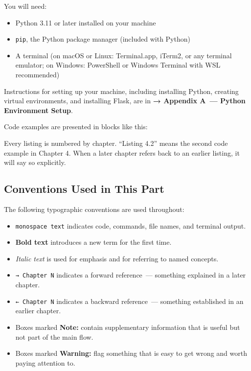You will need:

\begin{itemize}
\tightlist
\item
  Python 3.11 or later installed on your machine
\item
  \texttt{pip}, the Python package manager (included with Python)
\item
  A terminal (on macOS or Linux: Terminal.app, iTerm2, or any terminal emulator; on Windows: PowerShell or Windows Terminal with WSL recommended)
\end{itemize}

\noindent{}Instructions for setting up your machine, including installing Python, creating virtual environments, and installing Flask, are in \textbf{→ Appendix A~--- Python Environment Setup}.

Code examples are presented in blocks like this:

\begin{codebox}[short]

\begin{Shaded}
\begin{Highlighting}[]
\NormalTok{(}\NormalTok{)}
\end{Highlighting}
\end{Shaded}

\end{codebox}

\noindent{}Every listing is numbered by chapter. ``Listing 4.2'' means the second code example in Chapter 4. When a later chapter refers back to an earlier listing, it will say so explicitly.

\subsection*{Conventions Used in This Part}\label{part4-introduction:conventions-used-in-this-part}

The following typographic conventions are used throughout:

\begin{itemize}
\tightlist
\item
  \texttt{monospace\ text} indicates code, commands, file names, and terminal output.
\item
  \textbf{Bold text} introduces a new term for the first time.
\item
  \emph{Italic text} is used for emphasis and for referring to named concepts.
\item
  \texttt{→\ Chapter\ N} indicates a forward reference~--- something explained in a later chapter.
\item
  \texttt{←\ Chapter\ N} indicates a backward reference~--- something established in an earlier chapter.
\item
  Boxes marked \textbf{Note:} contain supplementary information that is useful but not part of the main flow.
\item
  Boxes marked \textbf{Warning:} flag something that is easy to get wrong and worth paying attention to.
\end{itemize}


